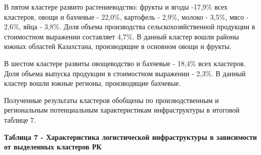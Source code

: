 \begin{multicols}{2}
В пятом кластере развито растениеводство: фрукты и ягоды -17,9\% всех
кластеров, овощи и бахчевые - 22,0\%, картофель - 2,9\%, молоко - 3,5\%,
мясо - 2,6\%, яйца - 3,8\%. Доля объема производства
сельскохозяйственной продукции в стоимостном выражении составляет 4,7\%.
В данный кластер вошли районы южных областей Казахстана, производящие в
основном овощи и фрукты.

В шестом кластере развиты овощеводство и бахчевые - 18,4\% всех
кластеров. Доля объема выпуска продукции в стоимостном выражении -
2,3\%. В данный кластер вошли южные регионы, производящие бахчевые.

Полученные результаты кластеров обобщены по производственным и
региональным потенциальным характеристикам инфраструктуры в итоговой
таблице 7.
\end{multicols}

{\bfseries Таблица 7 - Характеристика логистической инфраструктуры в зависимости от выделенных кластеров РК}


